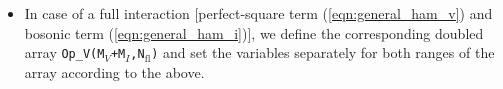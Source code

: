 \begin{itemize}
\item In case of a full interaction [perfect-square term (\ref{eqn:general_ham_v}) and bosonic term (\ref{eqn:general_ham_i})],
we  define  the corresponding doubled array \texttt{Op\_V(M$_V$+M$_I$,N$_\mathrm{fl}$)} and set the variables separately for both ranges of the array according to the above.  

\end{itemize}


